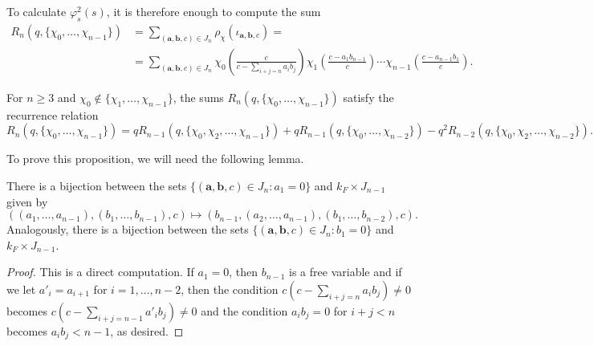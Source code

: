     To calculate $\varphi_s^2(s)$, it is therefore enough to compute the sum
    \begin{align*}
        R_n(q,\{\chi_0,\ldots,\chi_{n-1}\})&=\sum_{(\mathbf{a},\mathbf{b},c)\in J_n}\rho_\chi(\iota_{\mathbf{a},\mathbf{b},c})=\\
        &=\sum_{(\mathbf{a},\mathbf{b},c)\in J_n}\chi_0\left(\frac{c}{c-\sum_{i+j=n}a_ib_j}\right)\chi_1\left(\frac{c-a_1b_{n-1}}{c}\right)%
        \cdots\chi_{n-1}\left(\frac{c-a_{n-1}b_1}{c}\right).
    \end{align*}

    \begin{proposition}\label{prop_Rvalues}
        For $n\geq 3$ and $\chi_0\not\in\{\chi_1,\ldots,\chi_{n-1}\}$, the sums $R_n(q,\{\chi_0,\ldots,\chi_{n-1}\})$ satisfy the recurrence relation
        \begin{equation*}%
            R_n(q,\{\chi_0,\ldots,\chi_{n-1}\})=qR_{n-1}(q,\{\chi_0,\chi_2,\ldots,\chi_{n-1}\})+qR_{n-1}(q,\{\chi_0,\ldots,\chi_{n-2}\})-q^2R_{n-2}(q,\{\chi_0,\chi_2,\ldots,\chi_{n-2}\}).
        \end{equation*}
    \end{proposition}

    To prove this proposition, we will need the following lemma.

    \begin{lemma}\label{lem_Jsets}
        There is a bijection between the sets $\{(\mathbf{a},\mathbf{b},c)\in J_n:a_1=0\}$ and $k_F\times J_{n-1}$ given by
        $$((a_1,\ldots,a_{n-1}),(b_1,\ldots,b_{n-1}),c)\longmapsto (b_{n-1},(a_2,\ldots,a_{n-1}),(b_1,\ldots,b_{n-2}),c).$$
        Analogously, there is a bijection between the sets $\{(\mathbf{a},\mathbf{b},c)\in J_n:b_1=0\}$ and $k_F\times J_{n-1}$.
    \end{lemma}
    \begin{proof}
        This is a direct computation. If $a_1=0$, then $b_{n-1}$ is a free variable and if we let $a'_i=a_{i+1}$ for $i=1,\ldots,n-2$, then the condition $c(c-\sum_{i+j=n}a_ib_j)\neq0$ becomes $c(c-\sum_{i+j=n-1}a'_ib_j)\neq0$ and the condition $a_ib_j=0$ for $i+j<n$ becomes $a_ib_j<n-1$, as desired.
    \end{proof}

